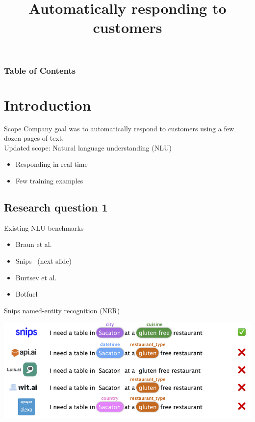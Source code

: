 \documentclass[pdf]{beamer}
\title{Automatically responding to customers}
\begin{document}
    \begin{frame}
        \titlepage
    \end{frame}

    \begin{frame}
        \frametitle{Table of Contents}
        \tableofcontents[hideothersubsections]
    \end{frame}

    \section{Introduction}

    \begin{frame}{Scope}
      Company goal was to automatically respond to customers using a few dozen
      pages of text.\\[5mm]

      Updated scope: Natural language understanding (NLU)
      \begin{itemize}
      \item Responding in real-time
        \item Few training examples
        \end{itemize}
    \end{frame}
    
    \subsection{Research question 1}
    \begin{frame}{Existing NLU benchmarks}
        \begin{itemize}
            \item Braun et al.~\cite{braun2017}
            \item Snips~\cite{snips2017benchmarking} (next slide)
            \item Burtsev et al.~\cite{burtsev2018}
            \item Botfuel~\cite{botfuel2018benchmark}
        \end{itemize}
    \end{frame}

    \begin{frame}{Snips named-entity recognition (NER)}
        \begin{center}
            \includegraphics[width=\textwidth]{figures/snips_ner.png}
        \end{center}
    \end{frame}
\end{document}

